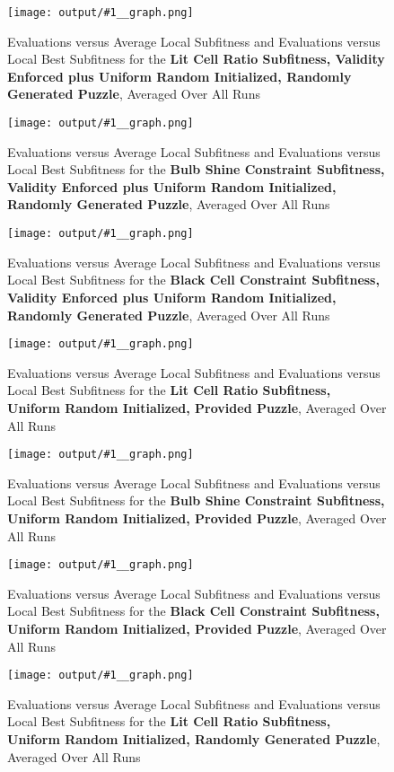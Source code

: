 \documentclass[11pt]{article}
\newcommand{\fitnessplotcaption}[1]{\caption{Evaluations versus Average Local Subfitness and Evaluations versus 
    Local Best Subfitness for the \textbf{{#1}}, Averaged Over All Runs}}
\newcommand{\addgraphic}[1]{\centerline{\texttt{[image: output/\#1\_\_graph.png]}}}
\begin{document}
\begin{figure}
    \addgraphic{random_gen/random_gen_lit_cell_ratio}
    \fitnessplotcaption{Lit Cell Ratio Subfitness, Validity Enforced plus Uniform Random Initialized, Randomly Generated Puzzle}
    \label{fig:random_gen_v_ratio}
\end{figure}

\begin{figure}
    \addgraphic{random_gen/random_gen_bulb_shine_constr}
    \fitnessplotcaption{Bulb Shine Constraint Subfitness, Validity Enforced plus Uniform Random Initialized, Randomly Generated Puzzle}
    \label{fig:random_gen_v_shine}
\end{figure}

\begin{figure}
    \addgraphic{random_gen/random_gen_black_cell_constr}
    \fitnessplotcaption{Black Cell Constraint Subfitness, Validity Enforced plus Uniform Random Initialized, Randomly Generated Puzzle}
    \label{fig:random_gen_v_black}
\end{figure}



\begin{figure}
    \addgraphic{website_puzzle/website_puzzle_uniform_random_init_lit_cell_ratio}
    \fitnessplotcaption{Lit Cell Ratio Subfitness, Uniform Random Initialized, Provided Puzzle}
    \label{fig:website_u_ratio}
\end{figure}

\begin{figure}
    \addgraphic{website_puzzle/website_puzzle_uniform_random_init_bulb_shine_constr}
    \fitnessplotcaption{Bulb Shine Constraint Subfitness, Uniform Random Initialized, Provided Puzzle}
    \label{fig:website_u_shine}
\end{figure}

\begin{figure}
    \addgraphic{website_puzzle/website_puzzle_uniform_random_init_black_cell_constr}
    \fitnessplotcaption{Black Cell Constraint Subfitness, Uniform Random Initialized, Provided Puzzle}
    \label{fig:website_u_black}
\end{figure}

\begin{figure}
    \addgraphic{random_gen/random_gen_uniform_random_init_lit_cell_ratio}
    \fitnessplotcaption{Lit Cell Ratio Subfitness, Uniform Random Initialized, Randomly Generated Puzzle}
    \label{fig:random_gen_u_ratio}
\end{figure}
\end{document}
